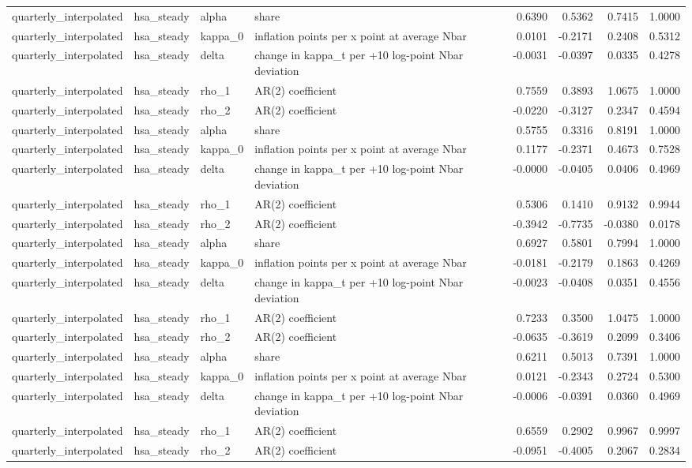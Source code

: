 \begin{tabular}{llllrrrr}
quarterly\_interpolated & hsa\_steady & alpha & share & 0.6390 & 0.5362 & 0.7415 & 1.0000 \\
quarterly\_interpolated & hsa\_steady & kappa\_0 & inflation points per x point at average Nbar & 0.0101 & -0.2171 & 0.2408 & 0.5312 \\
quarterly\_interpolated & hsa\_steady & delta & change in kappa\_t per +10 log-point Nbar deviation & -0.0031 & -0.0397 & 0.0335 & 0.4278 \\
quarterly\_interpolated & hsa\_steady & rho\_1 & AR(2) coefficient & 0.7559 & 0.3893 & 1.0675 & 1.0000 \\
quarterly\_interpolated & hsa\_steady & rho\_2 & AR(2) coefficient & -0.0220 & -0.3127 & 0.2347 & 0.4594 \\
quarterly\_interpolated & hsa\_steady & alpha & share & 0.5755 & 0.3316 & 0.8191 & 1.0000 \\
quarterly\_interpolated & hsa\_steady & kappa\_0 & inflation points per x point at average Nbar & 0.1177 & -0.2371 & 0.4673 & 0.7528 \\
quarterly\_interpolated & hsa\_steady & delta & change in kappa\_t per +10 log-point Nbar deviation & -0.0000 & -0.0405 & 0.0406 & 0.4969 \\
quarterly\_interpolated & hsa\_steady & rho\_1 & AR(2) coefficient & 0.5306 & 0.1410 & 0.9132 & 0.9944 \\
quarterly\_interpolated & hsa\_steady & rho\_2 & AR(2) coefficient & -0.3942 & -0.7735 & -0.0380 & 0.0178 \\
quarterly\_interpolated & hsa\_steady & alpha & share & 0.6927 & 0.5801 & 0.7994 & 1.0000 \\
quarterly\_interpolated & hsa\_steady & kappa\_0 & inflation points per x point at average Nbar & -0.0181 & -0.2179 & 0.1863 & 0.4269 \\
quarterly\_interpolated & hsa\_steady & delta & change in kappa\_t per +10 log-point Nbar deviation & -0.0023 & -0.0408 & 0.0351 & 0.4556 \\
quarterly\_interpolated & hsa\_steady & rho\_1 & AR(2) coefficient & 0.7233 & 0.3500 & 1.0475 & 1.0000 \\
quarterly\_interpolated & hsa\_steady & rho\_2 & AR(2) coefficient & -0.0635 & -0.3619 & 0.2099 & 0.3406 \\
quarterly\_interpolated & hsa\_steady & alpha & share & 0.6211 & 0.5013 & 0.7391 & 1.0000 \\
quarterly\_interpolated & hsa\_steady & kappa\_0 & inflation points per x point at average Nbar & 0.0121 & -0.2343 & 0.2724 & 0.5300 \\
quarterly\_interpolated & hsa\_steady & delta & change in kappa\_t per +10 log-point Nbar deviation & -0.0006 & -0.0391 & 0.0360 & 0.4969 \\
quarterly\_interpolated & hsa\_steady & rho\_1 & AR(2) coefficient & 0.6559 & 0.2902 & 0.9967 & 0.9997 \\
quarterly\_interpolated & hsa\_steady & rho\_2 & AR(2) coefficient & -0.0951 & -0.4005 & 0.2067 & 0.2834 \\
\bottomrule
\end{tabular}
